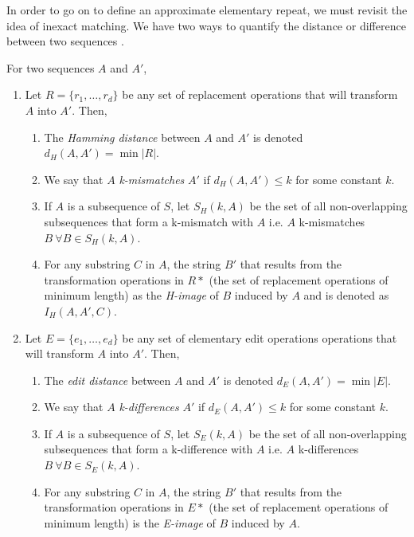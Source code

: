 In order to go on to define an approximate elementary repeat, we must revisit the idea of inexact matching. We have two ways to quantify the distance or difference between two sequences \cite{kurtz2001reputer, zheng2005discovery}.
\begin{notate}
For two sequences $A$ and $A'$,
\begin{enumerate}
\item{Let $R=\lbrace r_{1},\dotsc, r_{d} \rbrace$ be any set of replacement operations that will transform $A$ into $A'$. Then,
\begin{enumerate}
\item{The \textit{Hamming distance} between $A$ and $A'$ is denoted $d_{H}(A, A') = \min{|R|}$.}
\item{We say that $A$ \textit{k-mismatches} $A'$ if $d_{H}(A, A') \leq k$ for some constant $k$.}
\item{If $A$ is a subsequence of $S$, let $S_{H}(k, A)$ be the set of all non-overlapping subsequences that form a k-mismatch with $A$ i.e. $A$ k-mismatches $B \ \forall B \in S_{H}(k, A)$.}
\item{For any substring $C$ in $A$, the string $B'$ that results from the transformation operations in $R*$ (the set of replacement operations of minimum length) as the \textit{H-image} of $B$ induced by $A$ and is denoted as $I_{H}(A, A', C)$.}
\end{enumerate}}
\item{Let $E=\lbrace e_{1},\dotsc, e_{d} \rbrace$ be any set of elementary edit operations operations that will transform $A$ into $A'$. Then, 
\begin{enumerate}
\item{The \textit{edit distance} between $A$ and $A'$ is denoted $d_{E}(A, A') = \min{|E|}$.}
\item{We say that $A$ \textit{k-differences} $A'$ if $d_{E}(A, A') \leq k$ for some constant $k$.} 
\item{If $A$ is a subsequence of $S$, let $S_{E}(k, A)$ be the set of all non-overlapping subsequences that form a k-difference with $A$ i.e. $A$ k-differences $B \ \forall B \in S_{E}(k, A)$.}
\item{For any substring $C$ in $A$, the string $B'$ that results from the transformation operations in $E*$ (the set of replacement operations of minimum length) is the \textit{E-image} of $B$ induced by $A$.}
\end{enumerate}}
\end{enumerate}
\end{notate}

